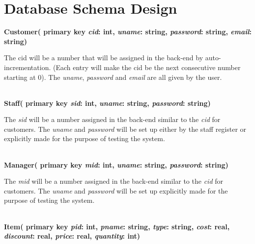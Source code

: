 \documentclass[letterpaper]{article}
\begin{document}
\section{Database Schema Design}
\textbf{Customer( primary key \textit{cid}: int, \textit{uname}: string, \textit{password}: string, \textit{email}: string)}
\begin{adjustwidth}{1.5cm}{}
The cid will be a number that will be assigned in the back-end by auto-incrementation.  (Each entry will make the cid be the next consecutive number starting at 0). The \textit{uname}, \textit{password} and \textit{email} are all given by the user.
\end{adjustwidth}\*\\
\textbf{Staff( primary key \textit{sid}: int, \textit{uname}: string, \textit{password}: string)}
\begin{adjustwidth}{1.5cm}{}
The \textit{sid} will be a number assigned in the back-end similar to the \textit{cid} for customers.  The \textit{uname} and \textit{password} will be set up either by the staff register or explicitly made for the purpose of testing the system.
\end{adjustwidth}\*\\
\textbf{Manager( primary key \textit{mid}: int, \textit{uname}: string, \textit{password}: string)}
\begin{adjustwidth}{1.5cm}{}
The \textit{mid} will be a number assigned in the back-end similar to the \textit{cid} for customers.  The \textit{uname} and \textit{password} will be set up explicitly made for the purpose of testing the system.
\end{adjustwidth}\*\\
\textbf{Item( primary key \textit{pid}: int, \textit{pname}: string, \textit{type}: string, \textit{cost}: real, \textit{discount}: real, \textit{price}: real, \textit{quantity}: int)}
\end{document}

